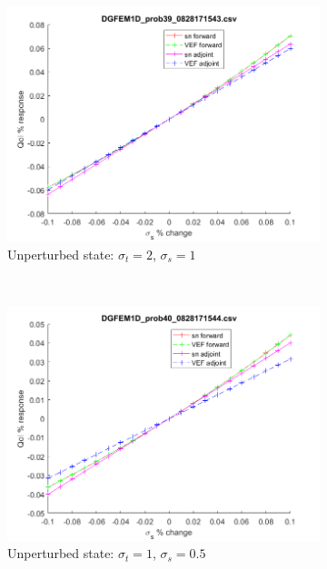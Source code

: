 \documentclass{article}
\newcommand{\sigt}{\sigma_t}
\newcommand{\sigs}{\sigma_s}
\begin{document}
\begin{figure}[H]
\label{InHomoPerts}
\centering
\begin{subfigure}{.65\textwidth}
  \centering
  \includegraphics[width=.98\linewidth]{figures/39sigsSens.png}
  \caption{Unperturbed state: $\sigt=2$, $\sigs=1$}
  \label{fig:sfig1}
\end{subfigure}%
\\
\begin{subfigure}{.65\textwidth}
  \centering
  \includegraphics[width=.98\linewidth]{figures/40sigsSens.png}
  \caption{Unperturbed state: $\sigt=1$, $\sigs=0.5$}
  \label{fig:sfig2}
\end{subfigure}
\\
\begin{subfigure}{.65\textwidth}

\end{subfigure}
\end{figure}
\end{document}

